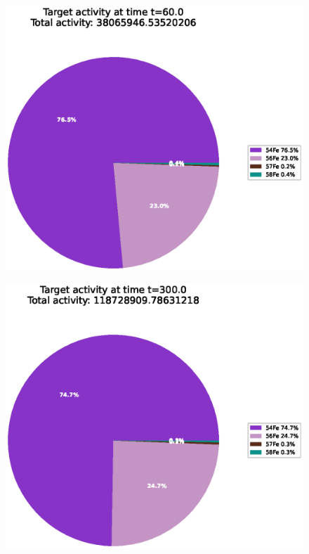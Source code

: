 \begin{figure}[!htb]
\centering
\includegraphics[width=0.8\linewidth]{chapters/activity_code/fe-activity-v2/target-activity/0020_60.eps}
\caption{}
\label{fig:activity-v2-target-activity-60s}
\end{figure}

\begin{figure}[!htb]
\centering
\includegraphics[width=0.8\linewidth]{chapters/activity_code/fe-activity-v2/target-activity/0100_300.eps}
\caption{}
\label{fig:activity-v2-target-activity-300s}
\end{figure}

